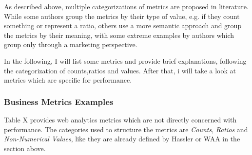 
As described above, multiple categorizations of metrics are proposed in literature.
While some authors group the metrics by their type of value, e.g. if they count something or represent a ratio, others use a more semantic approach and group the metrics by their meaning, with some extreme examples by authors which group only through a marketing perspective.

In the following, I will list some metrics and provide brief explanations, following the categorization of counts,ratios and values.
After that, i will take a look at metrics which are specific for performance.










\subsubsection{Business Metrics Examples}


Table X provides web analytics metrics which are not directly concerned with performance.
The categories used to structure the metrics are \textit{Counts}, \textit{Ratios} and \textit{Non-Numerical Values}, like they are already defined by Hassler or WAA in the section above. %






